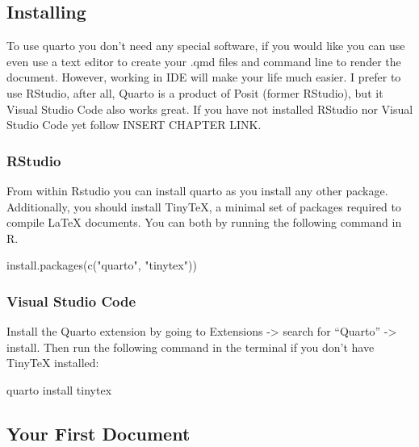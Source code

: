 \documentclass[
  letterpaper,
]{book}
\newenvironment{Shaded}{\begin{snugshade}}{\end{snugshade}}
\newcommand{\NormalTok}[1]{\textcolor[rgb]{0.00,0.23,0.31}{#1}}
\begin{document}
\hypertarget{installing}{%
\subsection{Installing}\label{installing}}

To use quarto you don't need any special software, if you would like you
can use even use a text editor to create your .qmd files and command
line to render the document. However, working in IDE will make your life
much easier. I prefer to use RStudio, after all, Quarto is a product of
Posit (former RStudio), but it Visual Studio Code also works great. If
you have not installed RStudio nor Visual Studio Code yet follow INSERT
CHAPTER LINK.

\hypertarget{rstudio}{%
\subsubsection{RStudio}\label{rstudio}}

From within Rstudio you can install quarto as you install any other
package. Additionally, you should install TinyTeX, a minimal set of
packages required to compile LaTeX documents. You can both by running
the following command in R.

\begin{Shaded}
\begin{Highlighting}[]
\NormalTok{install.packages(c("quarto", "tinytex"))}
\end{Highlighting}
\end{Shaded}

\hypertarget{visual-studio-code}{%
\subsubsection{Visual Studio Code}\label{visual-studio-code}}

Install the Quarto extension by going to Extensions -\textgreater{}
search for ``Quarto'' -\textgreater{} install. Then run the following
command in the terminal if you don't have TinyTeX installed:

\begin{Shaded}
\begin{Highlighting}[]
\NormalTok{quarto install tinytex}
\end{Highlighting}
\end{Shaded}

\hypertarget{your-first-document}{%
\subsection{Your First Document}\label{your-first-document}}
\end{document}
